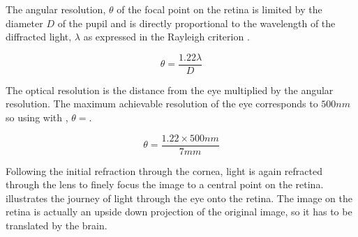 The angular resolution, $\theta$ of the focal point on the retina is limited by
the diameter $D$ of the pupil and is directly proportional to the wavelength
of the diffracted light, $\lambda$ as expressed in the Rayleigh criterion
 .\cite{rayleigh1907dynamical}

\begin{equation}
\theta=\frac{1.22\lambda}{D}
\label{eq:res_limit}
\end{equation}

The optical resolution is the distance from the eye multiplied by the angular
resolution. The maximum achievable resolution of the eye corresponds to
$500nm$ so using  with , $\theta=$.

\begin{equation}
\theta=\frac{1.22\times 500nm}{7mm}
\label{eq:eye_res}
\end{equation}

Following the initial refraction through the cornea, light is again refracted
through the lens to finely focus the image to a central point on the retina.
 illustrates the journey of light through the eye
onto the retina. The image on the retina is actually an upside down
projection of the original image, so it has to be translated by the brain.

